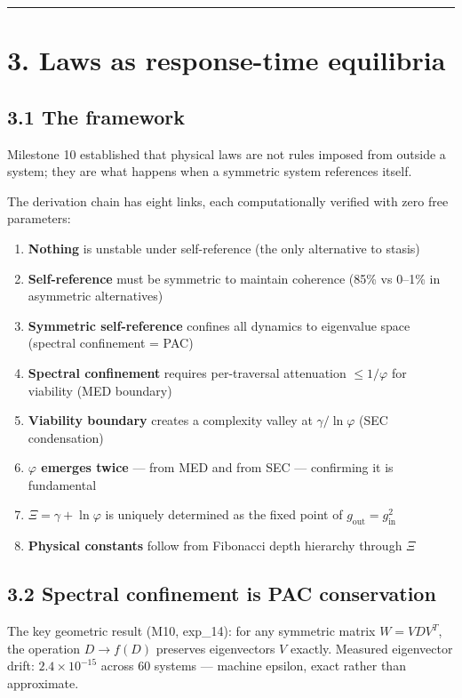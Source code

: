 \documentclass[11pt,a4paper]{article}
\providecommand{\tightlist}{\setlength{\itemsep}{0pt}\setlength{\parskip}{0pt}}
\begin{document}
\begin{center}\rule{0.5\linewidth}{0.4pt}\end{center}

\section*{3. Laws as response-time equilibria}

\subsection*{3.1 The framework}

Milestone 10 established that physical laws are not rules imposed from outside a system; they are what happens when a symmetric system references itself.

The derivation chain has eight links, each computationally verified with zero free parameters:

\begin{enumerate}\tightlist
\item \textbf{Nothing} is unstable under self-reference (the only alternative to stasis)
\item \textbf{Self-reference} must be symmetric to maintain coherence (85\% vs 0–1\% in asymmetric alternatives)
\item \textbf{Symmetric self-reference} confines all dynamics to eigenvalue space (spectral confinement = PAC)
\item \textbf{Spectral confinement} requires per-traversal attenuation $\leq 1/\varphi$ for viability (MED boundary)
\item \textbf{Viability boundary} creates a complexity valley at $\gamma/\ln\varphi$ (SEC condensation)
\item \textbf{$\varphi$ emerges twice} — from MED and from SEC — confirming it is fundamental
\item \textbf{$\Xi = \gamma + \ln\varphi$} is uniquely determined as the fixed point of $g_{\text{out}} = g_{\text{in}}^2$
\item \textbf{Physical constants} follow from Fibonacci depth hierarchy through $\Xi$
\end{enumerate}

\subsection*{3.2 Spectral confinement is PAC conservation}

The key geometric result (M10, exp\_14): for any symmetric matrix $W = V D V^T$, the operation $D \to f(D)$ preserves eigenvectors $V$ exactly. Measured eigenvector drift: $2.4 \times 10^{-15}$ across 60 systems — machine epsilon, exact rather than approximate.
\end{document}
